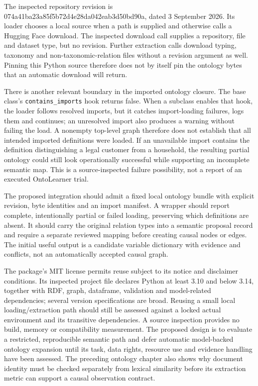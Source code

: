 The inspected repository revision is
074a41ba23a85f5b72d4e28da042eab3d50bd90a, dated 3 September 2026. Its
loader chooses a local source when a path is supplied and otherwise
calls a Hugging Face download. The inspected download call supplies a
repository, file and dataset type, but no revision. Further extraction
calls download typing, taxonomy and non-taxonomic-relation files without
a revision argument as well. Pinning this Python source therefore does
not by itself pin the ontology bytes that an automatic download will
return. \citep{v12_la_package_ontolearner}

There is another relevant boundary in the imported ontology closure. The
base class's \texttt{contains\_imports} hook returns false. When a
subclass enables that hook, the loader follows resolved imports, but it
catches import-loading failures, logs them and continues; an unresolved
import also produces a warning without failing the load. A nonempty
top-level graph therefore does not establish that all intended imported
definitions were loaded. If an unavailable import contains the
definition distinguishing a legal customer from a household, the
resulting partial ontology could still look operationally successful
while supporting an incomplete semantic map. This is a source-inspected
failure possibility, not a report of an executed OntoLearner trial.
\citep{exec13_ontolearner_inspection}

The proposed integration should admit a fixed local ontology bundle with
explicit revision, byte identities and an import manifest. A wrapper
should report complete, intentionally partial or failed loading,
preserving which definitions are absent. It should carry the original
relation types into a semantic proposal record and require a separate
reviewed mapping before creating causal nodes or edges. The initial
useful output is a candidate variable dictionary with evidence and
conflicts, not an automatically accepted causal graph.

The package's MIT license permits reuse subject to its notice and
disclaimer conditions. Its inspected project file declares Python at
least 3.10 and below 3.14, together with RDF, graph, dataframe,
validation and model-related dependencies; several version
specifications are broad. Reusing a small local loading/extraction path
should still be assessed against a locked actual environment and its
transitive dependencies. A source inspection provides no build, memory
or compatibility measurement. The proposed design is to evaluate a restricted, reproducible semantic path
and defer automatic model-backed ontology expansion until its task, data
rights, resource use and evidence handling have been assessed. The preceding
ontology chapter also shows why document identity must be checked separately
from lexical similarity before its extraction metric can support a causal
observation contract.
\citep{v12_la_package_ontolearner}

